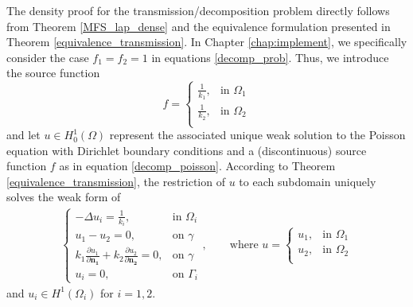 The density proof for the transmission/decomposition problem directly follows from Theorem \ref{MFS_lap_dense} and the equivalence formulation presented in Theorem \ref{equivalence_transmission}. In Chapter \ref{chap:implement}, we specifically consider the case \(f_1=f_2=1\) in equations \eqref{decomp_prob}. Thus, we introduce the source function
\begin{equation}
    f = \begin{cases}
        \frac{1}{k_1}, & \text{in } \Omega_1\\
        \frac{1}{k_2}, & \text{in } \Omega_2\\
    \end{cases}
\end{equation}
and let \(u \in H^1_0(\Omega)\) represent the associated unique weak solution to the Poisson equation with Dirichlet boundary conditions and a (discontinuous) source function \(f\) as in equation \eqref{decomp_poisson}. According to Theorem \ref{equivalence_transmission}, the restriction of \(u\) to each subdomain uniquely solves the weak form of
\begin{align}\label{transmission_restriction_equations_density}
    \begin{cases}
    - \Delta u_i = \frac{1}{k_i}, & \text{in }\Omega_i\\
    u_1 - u_2 = 0, & \text{on }\gamma\\
    k_1 \frac{\partial u_1}{\partial \mathbf{n_1}} + k_2 \frac{\partial u_2}{\partial  \mathbf{n_2}} = 0, & \text{on }\gamma\\
    u_i = 0, & \text{on }\Gamma_i
    \end{cases}
    ,\qquad
    \text{where }
    u = \begin{cases}
        u_1, & \text{in } \Omega_1\\
        u_2, & \text{in } \Omega_2\\
    \end{cases}
\end{align}
and \(u_i \in H^1(\Omega_i)\) for \(i=1, 2\).

